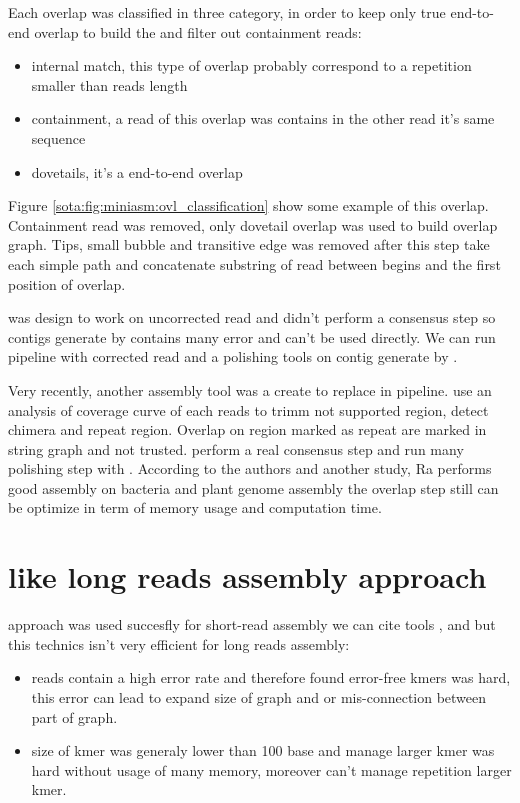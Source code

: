 \documentclass[main]{subfiles}
\begin{document}
Each overlap was classified in three category, in order to keep only true end-to-end overlap to build the \OLC and filter out containment reads:
\begin{itemize}
    \item internal match, this type of overlap probably correspond to a repetition smaller than reads length
    \item containment, a read of this overlap was contains in the other read it's same sequence
    \item dovetails, it's a end-to-end overlap
\end{itemize}
Figure \ref{sota:fig:miniasm:ovl_classification} show some example of this overlap. Containment read was removed, only dovetail overlap was used to build overlap graph. Tips, small bubble and transitive edge was removed after this step \miniasm take each simple path and concatenate substring of read between begins and the first position of overlap.

\miniasm was design to work on uncorrected read and didn't perform a consensus step so contigs generate by \miniasm contains many error and can't be used directly. We can run \minimap \miniasm pipeline with corrected read and a polishing tools on contig generate by \miniasm. 

Very recently, another assembly tool \cite{Ra} was a create to replace \miniasm in \minimap \miniasm pipeline.  use an analysis of coverage curve of each reads to trimm not supported region, detect chimera and repeat region. Overlap on region marked as repeat are marked in string graph and not trusted.  perform a real consensus step and run many polishing step with . According to the authors and another study\cite{long_read_assembler_comparison}, Ra performs good assembly on bacteria and plant genome assembly the overlap step still can be optimize in term of memory usage and computation time.

\section{\DBG like long reads assembly approach} \label{section:sota:wtdbg}

\DBG approach was used succesfly for short-read assembly we can cite tools  \cite{spades},  \cite{minia} and \cite{megahit} but this technics isn't very efficient for long reads assembly:
\begin{itemize}
    \item reads contain a high error rate and therefore found error-free kmers was hard, this error can lead to expand size of graph and or mis-connection between part of graph.
    \item size of kmer was generaly lower than 100 base and manage larger kmer was hard without usage of many memory, moreover \DBG can't manage repetition larger kmer.
\end{itemize}
\end{document}
